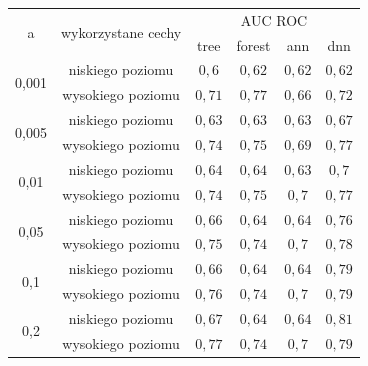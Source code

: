 \begin{table}[]
\centering
\begin{tabular}{|c|c|c|c|c|c|}
\hline
\multirow{2}{*}{a}                      &  \multirow{2}{*}{wykorzystane cechy} & \multicolumn{4}{c|}{AUC ROC} \\ \cline{3-6}

 &       & tree & forest & ann & dnn \\ \hline

\multirow{2}{*}{0,001} & niskiego poziomu   & $ 0,6 $ & $ 0,62 $ & $ 0,62 $ &$ 0,62 $ \\ \cline{2-6} 
                       & wysokiego poziomu & $ 0,71 $ & $ 0,77 $ & $ 0,66 $ &$ 0,72 $ \\ \hline 
                       
\multirow{2}{*}{0,005} & niskiego poziomu  & $ 0,63 $ & $ 0,63 $ & $ 0,63 $ &$ 0,67 $ \\ \cline{2-6} 
                       & wysokiego poziomu & $ 0,74 $ & $ 0,75 $ & $ 0,69 $ &$ 0,77 $ \\ \hline
                       
\multirow{2}{*}{0,01}  & niskiego poziomu  & $ 0,64 $ & $ 0,64 $ & $ 0,63 $ &$ 0,7 $ \\ \cline{2-6} 
                       & wysokiego poziomu & $ 0,74 $ & $ 0,75 $ & $ 0,7 $ &$ 0,77 $ \\ \hline
                       
\multirow{2}{*}{0,05}  & niskiego poziomu  & $ 0,66 $ & $ 0,64 $ & $ 0,64 $ &$ 0,76 $ \\ \cline{2-6} 
                       & wysokiego poziomu &  $ 0,75 $ & $ 0,74 $ & $ 0,7 $ &$ 0,78 $ \\ \hline
                       
\multirow{2}{*}{0,1}   & niskiego poziomu  &  $ 0,66 $ & $ 0,64 $ & $ 0,64 $ &$ 0,79 $ \\ \cline{2-6} 
                       & wysokiego poziomu &  $ 0,76 $ & $ 0,74 $ & $ 0,7 $ &$ 0,79 $ \\ \hline
                       
\multirow{2}{*}{0,2}   & niskiego poziomu  &  $ 0,67 $ & $ 0,64 $ & $ 0,64 $ &$ 0,81 $ \\ \cline{2-6} 
                       & wysokiego poziomu &  $ 0,77 $ & $ 0,74 $ & $ 0,7 $ &$ 0,79 $ \\ \hline
                       

\end{tabular}
\end{table}
